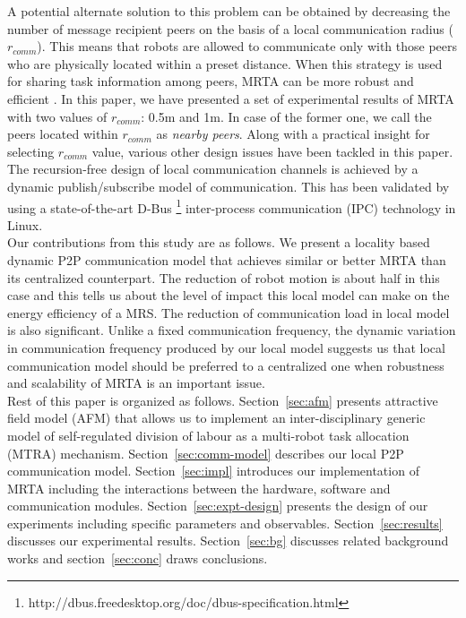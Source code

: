 \documentclass[letterpaper, 10 pt, times, conference]{ieeeconf} %
\begin{document}
A potential alternate solution to this problem can be obtained by decreasing the number of message recipient peers on the basis of a local communication radius ($r_{comm}$). This means that robots are allowed to communicate only with those peers who are physically located within a preset distance. When this strategy is used for sharing task information among peers, MRTA can be more robust and efficient \cite{Agassounon}. In this paper, we have presented a set of experimental results of MRTA with two values of $r_{comm}$: 0.5m and 1m. In case of the former one, we call the peers located within $r_{comm}$ as {\em nearby peers}. 
Along with a practical insight for selecting $r_{comm}$ value, various other design issues have been tackled in this paper. The recursion-free design of local communication channels is achieved by a dynamic publish/subscribe model of communication. This has been validated by using a state-of-the-art D-Bus \footnote{http://dbus.freedesktop.org/doc/dbus-specification.html} inter-process communication (IPC) technology in Linux.\\
Our contributions from this study are as follows. We present a locality based dynamic P2P communication model that achieves similar or better MRTA than its centralized counterpart. The reduction of robot motion is about half in this case and this tells us about the level of impact this local model can make on the energy efficiency of a MRS. The reduction of communication load in local model is also significant. Unlike a fixed communication frequency, the dynamic variation in communication frequency produced by our local model suggests us that local communication model should be preferred to a centralized one when robustness and scalability of MRTA is an important issue.\\
Rest of this paper is organized as follows. Section~\ref{sec:afm} presents attractive field model (AFM) \cite{Elsa} that allows us to implement an inter-disciplinary generic model of self-regulated division of labour as a multi-robot task allocation (MTRA) mechanism. Section~\ref{sec:comm-model} describes our local P2P communication model. Section~\ref{sec:impl} introduces our implementation of MRTA including the interactions between the hardware, software and communication modules. Section~\ref{sec:expt-design} presents the design of our experiments including specific parameters and observables. Section~\ref{sec:results} discusses our experimental results. Section~\ref{sec:bg} discusses related background works and section~\ref{sec:conc} draws conclusions.
%
\end{document}
